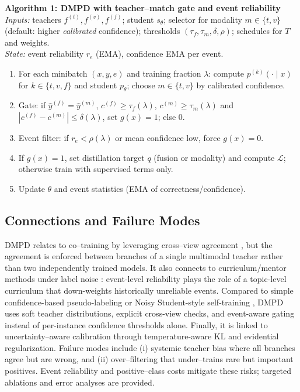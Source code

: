 \begin{center}
\begin{minipage}{0.97\linewidth}
\begin{small}
\textbf{Algorithm 1: DMPD with teacher–match gate and event reliability}\\
\textit{Inputs:} teachers $f^{(t)}, f^{(v)}, f^{(f)}$; student $s_\theta$; selector for modality $m\in\{t,v\}$ (default: higher \emph{calibrated} confidence); thresholds $(\tau_f,\tau_m,\delta,\rho)$; schedules for $T$ and weights.\\
\textit{State:} event reliability $r_e$ (EMA), confidence EMA per event.
\begin{enumerate}
  \item For each minibatch $(x,y,e)$ and training fraction $\lambda$: compute $p^{(k)}(\cdot\mid x)$ for $k\in\{t,v,f\}$ and student $p_\theta$; choose $m\in\{t,v\}$ by calibrated confidence.
  \item Gate: if $\hat y^{(f)}=\hat y^{(m)}$, $c^{(f)}\!\ge\!\tau_f(\lambda)$, $c^{(m)}\!\ge\!\tau_m(\lambda)$ and $|c^{(f)}-c^{(m)}|\le\delta(\lambda)$, set $g(x)=1$; else 0.
  \item Event filter: if $r_e\!<\!\rho(\lambda)$ or mean confidence low, force $g(x)=0$.
  \item If $g(x)=1$, set distillation target $q$ (fusion or modality) and compute $\mathcal L$; otherwise train with supervised terms only.
  \item Update $\theta$ and event statistics (EMA of correctness/confidence).
\end{enumerate}
\end{small}
\end{minipage}
\end{center}

\subsection{Connections and Failure Modes}
DMPD relates to co–training by leveraging cross–view agreement \citep{BlumMitchell1998}, but the agreement is enforced between branches of a single multimodal teacher rather than two independently trained models. It also connects to curriculum/mentor methods under label noise \citep{MentorNet2018,Han2018Coteaching}: event-level reliability plays the role of a topic-level curriculum that down-weights historically unreliable events. Compared to simple confidence-based pseudo-labeling or Noisy Student-style self-training \citep{Xie2020NoisyStudent}, DMPD uses soft teacher distributions, explicit cross-view checks, and event-aware gating instead of per-instance confidence thresholds alone. Finally, it is linked to uncertainty–aware calibration \citep{Guo2017Calibration,Sensoy2018EDL} through temperature-aware KL and evidential regularization. Failure modes include (i) systemic teacher bias where all branches agree but are wrong, and (ii) over–filtering that under–trains rare but important positives. Event reliability and positive–class costs mitigate these risks; targeted ablations and error analyses are provided.

